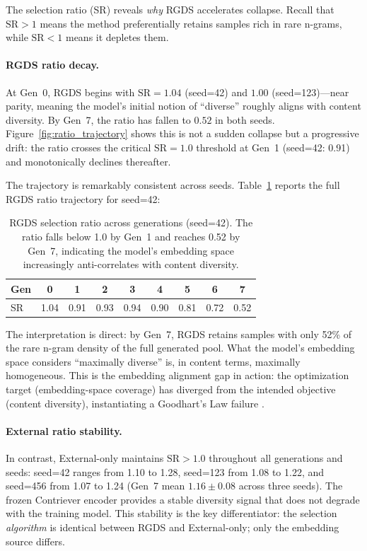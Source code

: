 The selection ratio (SR) reveals \textit{why} RGDS accelerates collapse. Recall that $\text{SR} > 1$ means the method preferentially retains samples rich in rare n-grams, while $\text{SR} < 1$ means it depletes them.

\paragraph{RGDS ratio decay.} At Gen~0, RGDS begins with $\text{SR} = 1.04$ (seed=42) and $1.00$ (seed=123)---near parity, meaning the model's initial notion of ``diverse'' roughly aligns with content diversity. By Gen~7, the ratio has fallen to $0.52$ in both seeds. Figure~\ref{fig:ratio_trajectory} shows this is not a sudden collapse but a progressive drift: the ratio crosses the critical $\text{SR} = 1.0$ threshold at Gen~1 (seed=42: 0.91) and monotonically declines thereafter.

The trajectory is remarkably consistent across seeds. Table~\ref{tab:sr_trajectory} reports the full RGDS ratio trajectory for seed=42:

\begin{table}[t]
\centering
\small
\begin{tabular}{lcccccccc}
\toprule
\textbf{Gen} & 0 & 1 & 2 & 3 & 4 & 5 & 6 & 7 \\
\midrule
SR & 1.04 & 0.91 & 0.93 & 0.94 & 0.90 & 0.81 & 0.72 & 0.52 \\
\bottomrule
\end{tabular}
\caption{RGDS selection ratio across generations (seed=42). The ratio falls below 1.0 by Gen~1 and reaches 0.52 by Gen~7, indicating the model's embedding space increasingly anti-correlates with content diversity.}
\label{tab:sr_trajectory}
\end{table}

The interpretation is direct: by Gen~7, RGDS retains samples with only 52\% of the rare n-gram density of the full generated pool. What the model's embedding space considers ``maximally diverse'' is, in content terms, maximally homogeneous. This is the embedding alignment gap in action: the optimization target (embedding-space coverage) has diverged from the intended objective (content diversity), instantiating a Goodhart's Law failure \citep{goodhart1984problems}.

\paragraph{External ratio stability.} In contrast, External-only maintains $\text{SR} > 1.0$ throughout all generations and seeds: seed=42 ranges from 1.10 to 1.28, seed=123 from 1.08 to 1.22, and seed=456 from 1.07 to 1.24 (Gen~7 mean $1.16 \pm 0.08$ across three seeds). The frozen Contriever encoder provides a stable diversity signal that does not degrade with the training model. This stability is the key differentiator: the selection \textit{algorithm} is identical between RGDS and External-only; only the embedding source differs.

